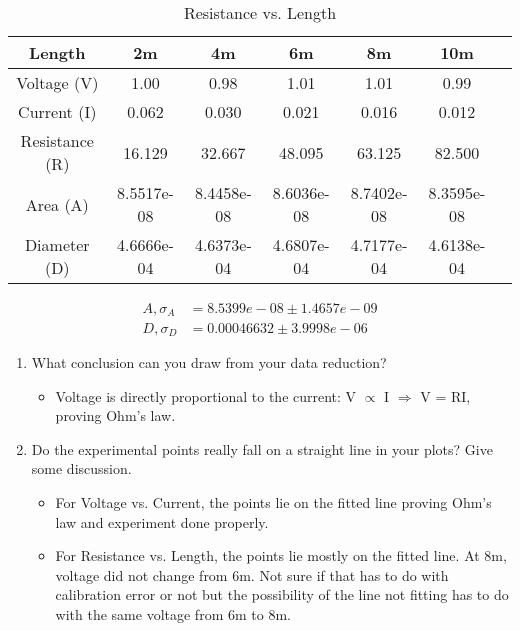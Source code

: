 \documentclass[a4paper]{article}
\begin{document}
\begin{table}[h!]
  \begin{center}
    \caption{Resistance vs. Length}\label{tab:table1}
    \begin{tabular}{|c|c|c|c|c|c|c|}\hline
      Length & 2m & 4m & 6m & 8m & 10m \\ \hline
      Voltage (V) & 1.00 & 0.98 & 1.01 & 1.01 & 0.99 \\ \hline
      Current (I) & 0.062 & 0.030 & 0.021 & 0.016 & 0.012 \\ \hline
      Resistance (R) & 16.129 & 32.667 & 48.095 & 63.125 & 82.500 \\ \hline
      Area (A) & 8.5517e-08 & 8.4458e-08 & 8.6036e-08 & 8.7402e-08 & 8.3595e-08 \\ \hline
      Diameter (D) & 4.6666e-04 & 4.6373e-04 &4.6807e-04 & 4.7177e-04 & 4.6138e-04 \\ \hline
    \end{tabular}
  \end{center}
  \begin{center}
    \begin{equation}
      \begin{split}
        A,\sigma_A &= \boxed{8.5399e - 08 \pm 1.4657e - 09}\\
        D,\sigma_D &= \boxed{0.00046632 \pm 3.9998e - 06}
      \end{split}
    \end{equation}
  \end{center}
\end{table}
\begin{enumerate}
  \item What conclusion can you draw from your data reduction?
  \begin{itemize}
    \item Voltage is directly proportional to the current: V \(\propto \) I \(\Rightarrow \) V = RI, proving Ohm's law.
  \end{itemize}
  \item Do the experimental points really fall on a straight line in your plots? Give some discussion.
  \begin{itemize}
    \item For Voltage vs. Current, the points lie on the fitted line proving Ohm's law and experiment done properly.
    \item For Resistance vs. Length, the points lie mostly on the fitted line. At 8m, voltage did not change from 6m. Not sure if that has to do with calibration error or not but the possibility of the line not fitting has to do with the same voltage from 6m to 8m.
  \end{itemize}
\end{enumerate}
\end{document}
